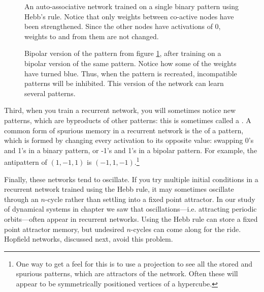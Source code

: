 \begin{figure}[h]
\centering
{}
\caption[Simbrain screenshot.]{An auto-associative network trained on a single binary pattern using Hebb's rule. Notice that only weights between co-active nodes have been strengthened. Since the other nodes have activations of 0, weights to and from them are not changed.}
\label{binary}
\end{figure}

\begin{figure}[h]
\centering
{}
\caption[Simbrain screenshot]{Bipolar version of the pattern from figure \ref{binary}, after training on a bipolar version of the same pattern. Notice how some of the weights have turned blue. Thus, when the pattern is recreated, incompatible patterns will be inhibited. This version of the network can learn several patterns.}
\label{bipolar}
\end{figure}

Third, when you train a recurrent network, you will sometimes notice new patterns, which are byproducts of other patterns: this is sometimes called a . A common form of spurious memory in a recurrent network is the  of a pattern, which is formed by changing every activation to its opposite value: swapping 0's and 1's in a binary pattern, or -1's and 1's in a bipolar pattern. For example, the antipattern of $(1,-1,1)$ is $(-1,1,-1)$.\footnote{One way to get a feel for this is to use a projection to see all the stored and spurious patterns, which are attractors of the network. Often these will appear to be symmetrically positioned vertices of a hypercube.} 

Finally, these networks tend to oscillate. If you try multiple initial conditions in a recurrent network trained using the Hebb rule, it may sometimes oscillate through an $n$-cycle rather than settling into a fixed point attractor. In our study of dynamical systems in chapter  we saw that oscillations---i.e. attracting periodic orbits---often appear in recurrent networks. Using the Hebb rule can store a fixed point attractor memory, but undesired $n$-cycles can come along for the ride. Hopfield networks, discussed next, avoid this problem.

